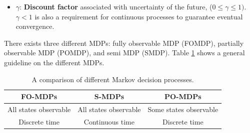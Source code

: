 \begin{itemize}
    \item $\gamma$: \textbf{Discount factor} associated with uncertainty of the future, ($0 \leq \gamma \leq 1)$. $\gamma < 1$ is also a requirement for continuous processes to guarantee eventual convergence.
\end{itemize}

There exists three different MDPs: fully observable MDP (FOMDP), partially observable MDP (POMDP), and semi MDP (SMDP). Table \ref{tab:01mdps} shows a general guideline on the different MDPs.

\begin{table}[H]
\caption{A comparison of different Markov decision processes.}
\centering
\begin{tabular}{c|c|c}
\textbf{FO-MDPs}	& \textbf{S-MDPs}	& \textbf{PO-MDPs}\\
\hline
All states observable		  & All states observable			& Some states observable \\
Discrete time		          & Continuous time	             	& Discrete time \\
\end{tabular}
\label{tab:01mdps}
\end{table}

